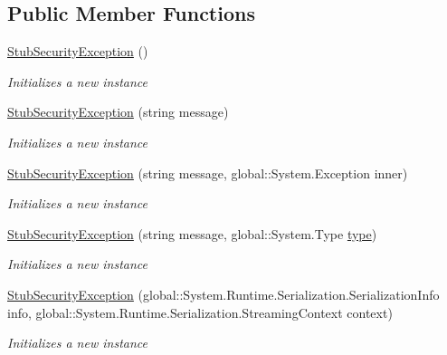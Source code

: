 \subsection*{Public Member Functions}
\begin{DoxyCompactItemize}
\item 
\hyperlink{class_system_1_1_security_1_1_fakes_1_1_stub_security_exception_a27c58c8b6a0ca95830edb0831e1d5c47}{Stub\-Security\-Exception} ()
\begin{DoxyCompactList}\small\item\em Initializes a new instance\end{DoxyCompactList}\item 
\hyperlink{class_system_1_1_security_1_1_fakes_1_1_stub_security_exception_af362b4f67ad6b6d1464b58e50c831cd2}{Stub\-Security\-Exception} (string message)
\begin{DoxyCompactList}\small\item\em Initializes a new instance\end{DoxyCompactList}\item 
\hyperlink{class_system_1_1_security_1_1_fakes_1_1_stub_security_exception_a265175cf2e0e389cd79aa1619c789c5f}{Stub\-Security\-Exception} (string message, global\-::\-System.\-Exception inner)
\begin{DoxyCompactList}\small\item\em Initializes a new instance\end{DoxyCompactList}\item 
\hyperlink{class_system_1_1_security_1_1_fakes_1_1_stub_security_exception_ab64cb6cd3e6dab7b4883f63a7f9b7e6b}{Stub\-Security\-Exception} (string message, global\-::\-System.\-Type \hyperlink{jquery-1_810_82-vsdoc_8js_a3940565e83a9bfd10d95ffd27536da91}{type})
\begin{DoxyCompactList}\small\item\em Initializes a new instance\end{DoxyCompactList}\item 
\hyperlink{class_system_1_1_security_1_1_fakes_1_1_stub_security_exception_a550110bae4172ded31ab96cfb961733a}{Stub\-Security\-Exception} (global\-::\-System.\-Runtime.\-Serialization.\-Serialization\-Info info, global\-::\-System.\-Runtime.\-Serialization.\-Streaming\-Context context)
\begin{DoxyCompactList}\small\item\em Initializes a new instance\end{DoxyCompactList}\item 

\end{DoxyCompactItemize}
